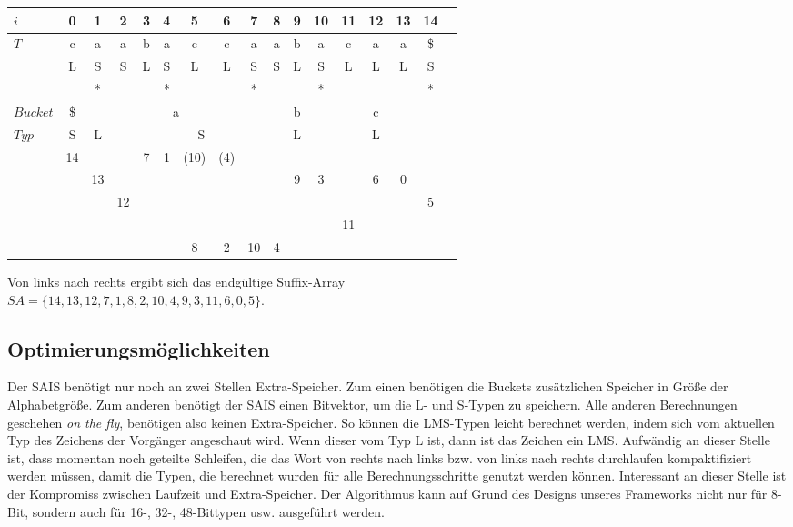 \begin{center}
  \begin{tabular}{ | l | c | c | c | c | c | c | c | c | c | c | c | c | c | c | c | c | }
    \hline
        $i$ & 0 & 1 & 2 & 3 & 4 & 5 & 6 & 7 & 8 & 9 & 10 & 11 & 12 & 13 & 14 \\ \hline
        $T$ & c & a & a & b & a & c & c & a & a & b & a & c & a & a & \$ \\ \hline
            & L & S & S & L & S & L & L & S & S & L & S & L & L & L & S \\ \hline
            &   & * &   &   & * &   &   & * &   &   & * &   &   &   & * \\ \hline
   $Bucket$ &\$ & \multicolumn{7}{c}{a} &   & \multicolumn{1}{c}{b} &   & \multicolumn{3}{c}{c} & \\ \hline
      $Typ$ & S & \multicolumn{1}{c}{L} &   & \multicolumn{5}{c}{S} &   & \multicolumn{1}{c}{L} &    & \multicolumn{3}{c}{L} &\\ \hline
            & 14 & & & 7 & 1 & (10) & (4) & & &  &   & &   &   &  \\ \hline
            & & 13 & & & & & & & & 9 & 3 & & 6 & 0 & \\ \hline
            &  &  & 12 & & & & & & & & & & &  & 5 \\ \hline
            & & & & & &   & & &   &   & & 11 & & & \\ \hline
            & & & & & & 8 & 2 & 10 & 4 &   & &   &   &   & \\
    \hline
  \end{tabular}
\end{center}
\bigskip
Von links nach rechts ergibt sich das endgültige Suffix-Array \\
$SA = \{14, 13, 12, 7, 1, 8, 2, 10, 4, 9, 3, 11, 6, 0, 5\}$.

\subsection{Optimierungsmöglichkeiten}
Der SAIS benötigt nur noch an zwei Stellen Extra-Speicher. Zum einen benötigen die Buckets zusätzlichen Speicher in Größe der Alphabetgröße. Zum anderen benötigt der SAIS einen Bitvektor, um die L- und S-Typen zu speichern. Alle anderen Berechnungen geschehen \textit{on the fly}, benötigen also keinen Extra-Speicher. So können die LMS-Typen leicht berechnet werden, indem sich vom aktuellen Typ des Zeichens der Vorgänger angeschaut wird. Wenn dieser vom Typ L ist, dann ist das Zeichen ein LMS. Aufwändig an dieser Stelle ist, dass momentan noch geteilte Schleifen, die das Wort von rechts nach links bzw. von links nach rechts durchlaufen kompaktifiziert werden müssen, damit die Typen, die berechnet wurden für alle Berechnungsschritte genutzt werden können. Interessant an dieser Stelle ist der Kompromiss zwischen Laufzeit und Extra-Speicher. Der Algorithmus kann auf Grund des Designs unseres Frameworks nicht nur für 8-Bit, sondern auch für 16-, 32-, 48-Bittypen usw. ausgeführt werden.

